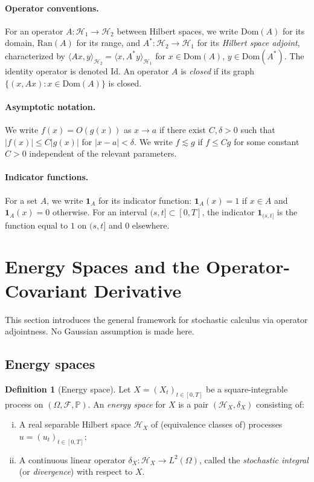 \documentclass[11pt,a4paper]{article}
\theoremstyle{plain}
\theoremstyle{definition}
\newtheorem{definition}[theorem]{Definition}
\theoremstyle{remark}
\newcommand{\Dom}{\mathrm{Dom}}
\newcommand{\Ran}{\mathrm{Ran}}
\newcommand{\Id}{\mathrm{Id}}
\newcommand{\ip}[2]{\langle #1, #2 \rangle}
\newcommand{\Prob}{\mathbb{P}}
\newcommand{\Lp}[1]{L^{#1}}
\newcommand{\HX}{\mathcal{H}_X}
\begin{document}
\paragraph{Operator conventions.}
For an operator $A: \mathcal{H}_1 \to \mathcal{H}_2$ between Hilbert spaces, we write $\Dom(A)$ for its domain, $\Ran(A)$ for its range, and $A^*: \mathcal{H}_2 \to \mathcal{H}_1$ for its \emph{Hilbert space adjoint}, characterized by $\ip{Ax}{y}_{\mathcal{H}_2} = \ip{x}{A^* y}_{\mathcal{H}_1}$ for $x \in \Dom(A)$, $y \in \Dom(A^*)$. The identity operator is denoted $\Id$. An operator $A$ is \emph{closed} if its graph $\{(x, Ax) : x \in \Dom(A)\}$ is closed.

\paragraph{Asymptotic notation.}
We write $f(x) = O(g(x))$ as $x \to a$ if there exist $C, \delta > 0$ such that $|f(x)| \leq C|g(x)|$ for $|x - a| < \delta$. We write $f \lesssim g$ if $f \leq Cg$ for some constant $C > 0$ independent of the relevant parameters.

\paragraph{Indicator functions.}
For a set $A$, we write $\mathbf{1}_A$ for its indicator function: $\mathbf{1}_A(x) = 1$ if $x \in A$ and $\mathbf{1}_A(x) = 0$ otherwise. For an interval $(s,t] \subset [0,T]$, the indicator $\mathbf{1}_{(s,t]}$ is the function equal to $1$ on $(s,t]$ and $0$ elsewhere.

\section{Energy Spaces and the Operator-Covariant Derivative}\label{sec:energy}

This section introduces the general framework for stochastic calculus via operator adjointness. No Gaussian assumption is made here.

\subsection{Energy spaces}

\begin{definition}[Energy space]\label{def:energy-space}
Let $X = (X_t)_{t \in [0,T]}$ be a square-integrable process on $(\Omega, \mathcal{F}, \Prob)$. An \emph{energy space} for $X$ is a pair $(\HX, \delta_X)$ consisting of:
\begin{enumerate}[(i)]
\item A real separable Hilbert space $\HX$ of (equivalence classes of) processes $u = (u_t)_{t \in [0,T]}$;
\item A continuous linear operator $\delta_X: \HX \to \Lp{2}(\Omega)$, called the \emph{stochastic integral} (or \emph{divergence}) with respect to $X$.
\end{enumerate}
\end{definition}
\end{document}
